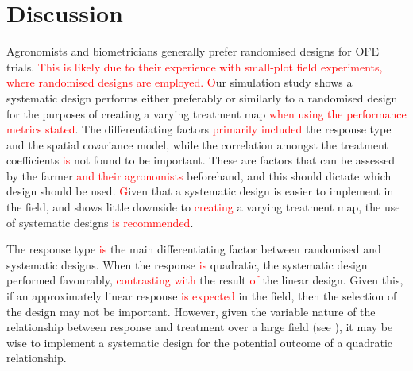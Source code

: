 \documentclass[a4paper]{article} 	%
\newcommand{\Matern}{Mat\'ern }
\newcommand{\zc}[1]{\textcolor{red}{#1}}
\begin{document}
\section{Discussion}\label{Sec:Dis}

Agronomists and biometricians generally prefer randomised designs for OFE trials. \zc{This is likely due to their experience with small-plot field experiments, where randomised designs are employed.} \zc{O}ur simulation study shows a systematic design performs either preferably or similarly to a randomised design for the purposes of creating a varying treatment map \zc{when using the performance metrics stated}. The differentiating factors \zc{primarily included} the response type and the spatial covariance model, while the correlation amongst the treatment coefficients \zc{is} not found to be important. These are factors that can be assessed by the farmer \zc{and their agronomists} beforehand, and this should dictate which design should be used. \zc{G}iven that a systematic design is easier to implement in the field, and shows little downside to \zc{creating} a varying treatment map, the use of systematic designs \zc{is recommended}. 

The response type \zc{is} the main differentiating factor between randomised and systematic designs. When the response \zc{is} quadratic, the systematic design performed favourably, \zc{contrasting with} the result \zc{of} the linear design. Given this, if an approximately linear response \zc{is expected} in the field, then the selection of the design may not be important. However, given the variable nature of the relationship between response and treatment over a large field (see \textcite{Rakshit2020Novel}), it may be wise to implement a systematic design for the potential outcome of a quadratic relationship. 

\end{document}
